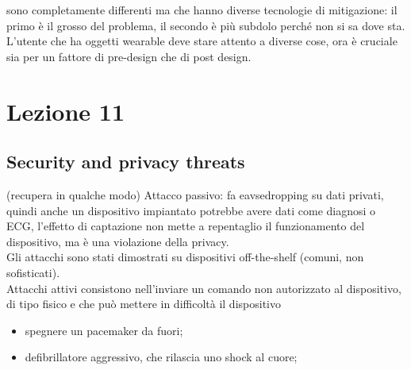 \documentclass[oneside, 12pt]{extbook}
\begin{document}
sono completamente differenti ma che hanno diverse tecnologie di mitigazione: il primo è il grosso del problema, il secondo è più subdolo perché non si sa dove sta.\\L'utente che ha oggetti wearable deve stare attento  a diverse cose, ora è cruciale sia per un fattore di pre-design che di post design.

\chapter{Lezione 11}
\section{Security and privacy threats}
(recupera in qualche modo)
Attacco passivo: fa eavsedropping su dati privati, quindi anche un dispositivo impiantato potrebbe avere dati come diagnosi o ECG, l'effetto di captazione non mette a repentaglio il funzionamento del dispositivo, ma è una violazione della privacy.\\Gli attacchi sono stati dimostrati su dispositivi off-the-shelf (comuni, non sofisticati).\\Attacchi attivi consistono nell'inviare un comando non autorizzato al dispositivo, di tipo fisico e che può mettere in difficoltà il dispositivo
\begin{itemize}
	\item spegnere un pacemaker da fuori;
	\item defibrillatore aggressivo, che rilascia uno shock al cuore;
\end{itemize}
\end{document}

